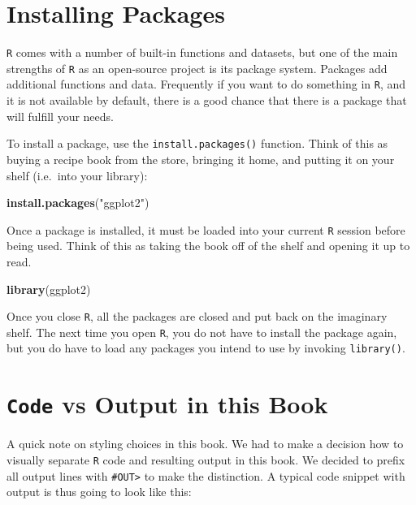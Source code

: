 \documentclass[]{book}
\newenvironment{Shaded}{\begin{snugshade}}{\end{snugshade}}
\newcommand{\KeywordTok}[1]{\textcolor[rgb]{0.13,0.29,0.53}{\textbf{#1}}}
\newcommand{\StringTok}[1]{\textcolor[rgb]{0.31,0.60,0.02}{#1}}
\newcommand{\NormalTok}[1]{#1}
\theoremstyle{definition}
\theoremstyle{definition}
\theoremstyle{definition}
\theoremstyle{remark}
\begin{document}
\section{Installing Packages}\label{installing-packages}

\texttt{R} comes with a number of built-in functions and datasets, but
one of the main strengths of \texttt{R} as an open-source project is its
package system. Packages add additional functions and data. Frequently
if you want to do something in \texttt{R}, and it is not available by
default, there is a good chance that there is a package that will
fulfill your needs.

To install a package, use the \texttt{install.packages()} function.
Think of this as buying a recipe book from the store, bringing it home,
and putting it on your shelf (i.e.~into your library):

\begin{Shaded}
\begin{Highlighting}[]
\KeywordTok{install.packages}\NormalTok{(}\StringTok{"ggplot2"}\NormalTok{)}
\end{Highlighting}
\end{Shaded}

Once a package is installed, it must be loaded into your current
\texttt{R} session before being used. Think of this as taking the book
off of the shelf and opening it up to read.

\begin{Shaded}
\begin{Highlighting}[]
\KeywordTok{library}\NormalTok{(ggplot2)}
\end{Highlighting}
\end{Shaded}

Once you close \texttt{R}, all the packages are closed and put back on
the imaginary shelf. The next time you open \texttt{R}, you do not have
to install the package again, but you do have to load any packages you
intend to use by invoking \texttt{library()}.

\section{\texorpdfstring{\texttt{Code} vs Output in this
Book}{Code vs Output in this Book}}\label{code-output}

A quick note on styling choices in this book. We had to make a decision
how to visually separate \texttt{R} code and resulting output in this
book. We decided to prefix all output lines with
\texttt{\#OUT\textgreater{}} to make the distinction. A typical code
snippet with output is thus going to look like this:
\end{document}
